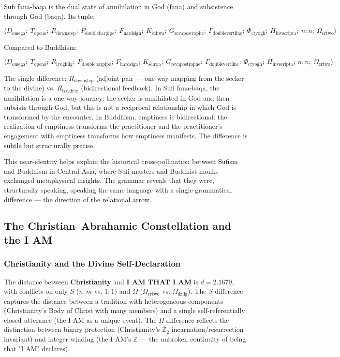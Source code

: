 \documentclass[12pt,a4paper]{article}
\begin{document}
Sufi fana-baqa is the dual state of annihilation in God (fana) and subsistence through God (baqa). Its tuple:


\[\langle D_{\text{omega}};\ T_{\text{openo}};\ R_{\text{downstep}};\ P_{\text{doublebarpipe}};\ F_{\text{hardsign}};\ K_{\text{schwa}};\ G_{\text{revapostrophe}};\ \Gamma_{\text{doublevertline}};\ \Phi_{\text{ctyogh}};\ H_{\text{invscripta}};\ n{:}n;\ \Omega_{\text{crtwo}} \rangle\]

Compared to Buddhism:


\[\langle D_{\text{omega}};\ T_{\text{openo}};\ R_{\text{lyoghlig}};\ P_{\text{doublebarpipe}};\ F_{\text{hardsign}};\ K_{\text{schwa}};\ G_{\text{revapostrophe}};\ \Gamma_{\text{doublevertline}};\ \Phi_{\text{ctyogh}};\ H_{\text{invscripta}};\ n{:}n;\ \Omega_{\text{crtwo}} \rangle\]

The single difference: $R_{\text{downstep}}$ (adjoint pair --- one-way mapping from the seeker to the divine) vs. $R_{\text{lyoghlig}}$ (bidirectional feedback). In Sufi fana-baqa, the annihilation is a one-way journey: the seeker is annihilated in God and then subsists through God, but this is not a reciprocal relationship in which God is transformed by the encounter. In Buddhism, emptiness is bidirectional: the realization of emptiness transforms the practitioner and the practitioner's engagement with emptiness transforms how emptiness manifests. The difference is subtle but structurally precise.

This near-identity helps explain the historical cross-pollination between Sufism and Buddhism in Central Asia, where Sufi masters and Buddhist monks exchanged metaphysical insights. The grammar reveals that they were, structurally speaking, speaking the same language with a single grammatical difference --- the direction of the relational arrow.

\subsection{The Christian--Abrahamic Constellation and the I AM}

\subsubsection{Christianity and the Divine Self-Declaration}

The distance between \textbf{Christianity} and \textbf{I AM THAT I AM} is $d = 2.1679$, with conflicts on only $S$ ($n{:}m$ vs. $1{:}1$) and $\Omega$ ($\Omega_{\text{crtwo}}$ vs. $\Omega_{\text{dzlig}}$). The $S$ difference captures the distance between a tradition with heterogeneous components (Christianity's Body of Christ with many members) and a single self-referentially closed utterance (the I AM as a unique event). The $\Omega$ difference reflects the distinction between binary protection (Christianity's $\mathbb{Z}_2$ incarnation/resurrection invariant) and integer winding (the I AM's $\mathbb{Z}$ --- the unbroken continuity of being that "I AM" declares).
\end{document}
